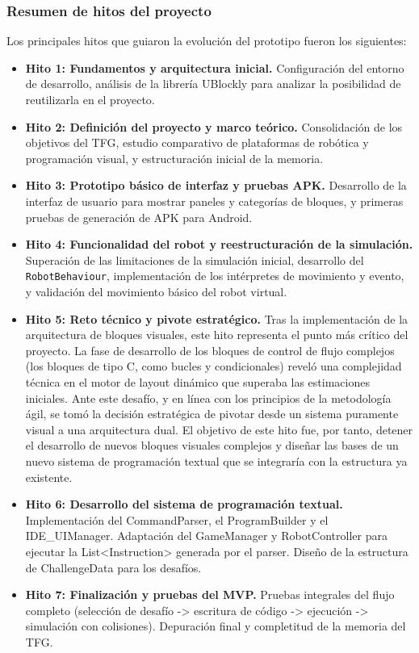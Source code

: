 \subsubsection{Resumen de hitos del proyecto} 
Los principales hitos que guiaron la evolución del prototipo fueron los siguientes:
\begin{itemize}
	\item \textbf{Hito 1: Fundamentos y arquitectura inicial.}
	Configuración del entorno de desarrollo, análisis de la librería UBlockly\cite{UBlockly} para analizar la posibilidad de reutilizarla en el proyecto.

	\item \textbf{Hito 2: Definición del proyecto y marco teórico.}
	Consolidación de los objetivos del TFG, estudio comparativo de plataformas de robótica y programación visual, y estructuración inicial de la memoria.
	
	\item \textbf{Hito 3: Prototipo básico de interfaz y pruebas APK.}
	Desarrollo de la interfaz de usuario para mostrar paneles y categorías de bloques, y primeras pruebas de generación de APK para Android.
	
	\item \textbf{Hito 4: Funcionalidad del robot y reestructuración de la simulación.}
	Superación de las limitaciones de la simulación inicial, desarrollo del \texttt{RobotBehaviour}, implementación de los intérpretes de movimiento y evento, y validación del movimiento básico del robot virtual.

	
	\item \textbf{Hito 5: Reto técnico y pivote estratégico.} Tras la implementación de la arquitectura de bloques visuales, este hito representa el punto más crítico del proyecto. La fase de desarrollo de los bloques de control de flujo complejos (los bloques de tipo C, como bucles y condicionales) reveló una complejidad técnica en el motor de layout dinámico que superaba las estimaciones iniciales. Ante este desafío, y en línea con los principios de la metodología ágil, se tomó la decisión estratégica de pivotar desde un sistema puramente visual a una arquitectura dual. El objetivo de este hito fue, por tanto, detener el desarrollo de nuevos bloques visuales complejos y diseñar las bases de un nuevo sistema de programación textual que se integraría con la estructura ya existente.

	\item \textbf{Hito 6: Desarrollo del sistema de programación textual.} Implementación del CommandParser, el ProgramBuilder y el IDE\_UIManager. Adaptación del GameManager y RobotController para ejecutar la List<Instruction> generada por el parser. Diseño de la estructura de ChallengeData para los desafíos.
	
	\item \textbf{Hito 7: Finalización y pruebas del MVP.} Pruebas integrales del flujo completo (selección de desafío -> escritura de código -> ejecución -> simulación con colisiones). Depuración final y completitud de la memoria del TFG.

\end{itemize}

